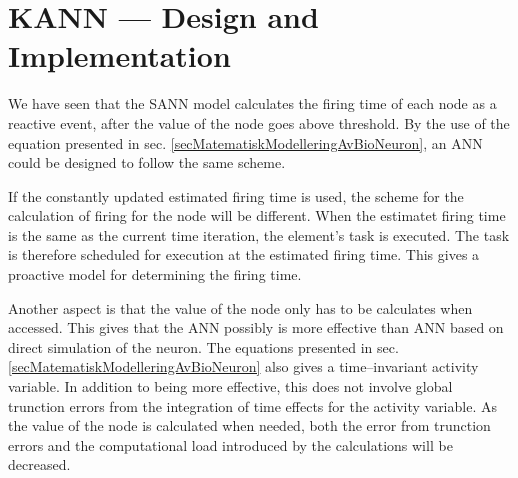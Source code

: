 
%



\section{KANN --- Design and Implementation}
\label{secKANN}
	
	We have seen that the SANN model calculates the firing time of each node as a reactive event, after the value of the node goes above threshold.
	By the use of the equation presented in sec. \ref{secMatematiskModelleringAvBioNeuron}, an ANN could be designed to follow the same scheme.

	If the constantly updated estimated firing time is used, the scheme for the calculation of firing for the node will be different.
	When the estimatet firing time is the same as the current time iteration, the element's task is executed.
	The task is therefore scheduled for execution at the estimated firing time.
	This gives a proactive model for determining the firing time.

	Another aspect is that the value of the node only has to be calculates when accessed.
	This gives that the ANN possibly is more effective than ANN based on direct simulation of the neuron.
	The equations presented in sec. \ref{secMatematiskModelleringAvBioNeuron} also gives a time--invariant activity variable.
	In addition to being more effective, this does not involve global trunction errors from the integration of time effects for the activity variable.
	As the value of the node is calculated when needed, both the error from trunction errors and the computational load introduced by the calculations will be decreased.

